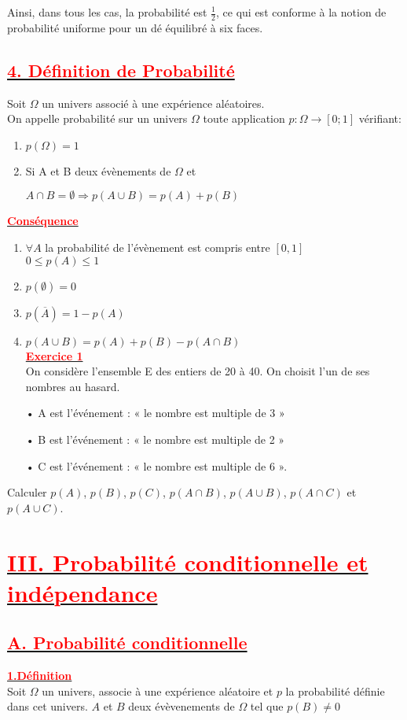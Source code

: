 \documentclass[12pt,a4paper]{article}
\begin{document}
Ainsi, dans tous les cas, la probabilité est $\frac{1}{2}$, ce qui est conforme à la notion de probabilité uniforme pour un dé équilibré à six faces.
\subsection*{\underline{\textbf{\textcolor{red}{4. Définition de Probabilité}}}}
Soit $\Omega$ un univers associé à une expérience aléatoires.\\
On appelle probabilité sur un univers $\Omega$ toute application 
$p:\Omega \rightarrow[0;1]$ vérifiant:
\begin{enumerate}
\item $p(\Omega)=1$
\item Si A et B deux évènements de $\Omega$ et

$A\cap B=\emptyset \Longrightarrow p(A\cup B)=p(A)+p(B)$
\end{enumerate}
\underline{\textbf{\textcolor{red}{Conséquence}}}\\
\begin{enumerate}
\item $\forall A$ la probabilité de l'évènement est compris entre $[0,1]$\\
$0 \leq p(A)\leq 1$
\item $p(\emptyset)=0$
\item$p(\overline{A})=1-p(A)$
\item $p(A \cup B)=p(A)+p(B)-p(A\cap B)$\\
\underline{\textbf{\textcolor{red}{Exercice 1}}}\\
On considère l’ensemble E des entiers de 20 à 40. On choisit l’un de ses nombres au hasard.
\end{enumerate}
\begin{itemize}
\item[•] A est l’événement : « le nombre est multiple de 3 »
\item[•] B est l’événement : « le nombre est multiple de 2 »
\item[•] C est l’événement : « le nombre est multiple de 6 ».
\end{itemize}
Calculer $p(A)$, $p(B)$, $p(C)$, $p(A\cap B)$, $p(A\cup B)$, $p(A\cap C)$ et $p(A\cup C)$.

\section*{\underline{\textbf{\textcolor{red}{III. Probabilité conditionnelle et indépendance}}}}
\subsection*{\underline{\textbf{\textcolor{red}{A. Probabilité conditionnelle}}}}
\underline{\textbf{\textcolor{red}{1.Définition}}}\\
Soit $\Omega$ un univers, associe à une expérience aléatoire et $p$ la probabilité définie dans cet univers. $A$ et $B$ deux évèvenements de $\Omega$ tel que $p(B)\neq 0$
\end{document}
